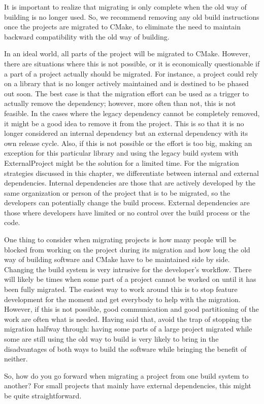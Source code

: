 It is important to realize that migrating is only complete when the old way of building is no longer used. So, we recommend removing any old build instructions once the projects are migrated to CMake, to eliminate the need to maintain backward compatibility with the old way of building.

In an ideal world, all parts of the project will be migrated to CMake. However, there are situations where this is not possible, or it is economically questionable if a part of a project actually should be migrated. For instance, a project could rely on a library that is no longer actively maintained and is destined to be phased out soon. The best case is that the migration effort can be used as a trigger to actually remove the dependency; however, more often than not, this is not feasible. In the cases where the legacy dependency cannot be completely removed, it might be a good idea to remove it from the project. This is so that it is no longer considered an internal dependency but an external dependency with its own release cycle. Also, if this is not possible or the effort is too big, making an exception for this particular library and using the legacy build system with ExternalProject might be the solution for a limited time. For the migration strategies discussed in this chapter, we differentiate between internal and external dependencies. Internal dependencies are those that are actively developed by the same organization or person of the project that is to be migrated, so the developers can potentially change the build process. External dependencies are those where developers have limited or no control over the build process or the code.

One thing to consider when migrating projects is how many people will be blocked from working on the project during its migration and how long the old way of building software and CMake have to be maintained side by side. Changing the build system is very intrusive for the developer's workflow. There will likely be times when some part of a project cannot be worked on until it has been fully migrated. The easiest way to work around this is to stop feature development for the moment and get everybody to help with the migration. However, if this is not possible, good communication and good partitioning of the work are often what is needed. Having said that, avoid the trap of stopping the migration halfway through: having some parts of a large project migrated while some are still using the old way to build is very likely to bring in the disadvantages of both ways to build the software while bringing the benefit of neither.

So, how do you go forward when migrating a project from one build system to another? For small projects that mainly have external dependencies, this might be quite straightforward.




















